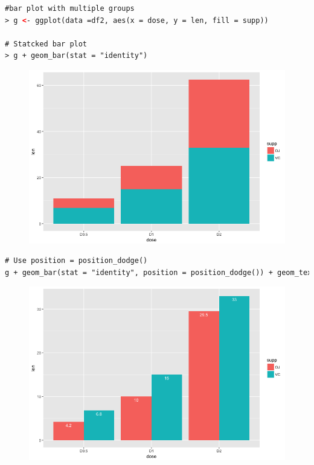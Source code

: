 \begin{lstlisting}[language=html]
#bar plot with multiple groups
> g <- ggplot(data =df2, aes(x = dose, y = len, fill = supp))

# Statcked bar plot
> g + geom_bar(stat = "identity")
\end{lstlisting}
\begin{figure}[H]\begin{center}\includegraphics[scale=1 ]{ilu/bg134.png}\end{center}\end{figure}
\begin{lstlisting}[language=html]
# Use position = position_dodge()
g + geom_bar(stat = "identity", position = position_dodge()) + geom_text(aes(label = len), vjust = 1.6, color = "white", position = position_dodge(0.9), size = 3.5)
\end{lstlisting}
\begin{figure}[H]\begin{center}\includegraphics[scale=1 ]{ilu/bg135.png}\end{center}\end{figure}

